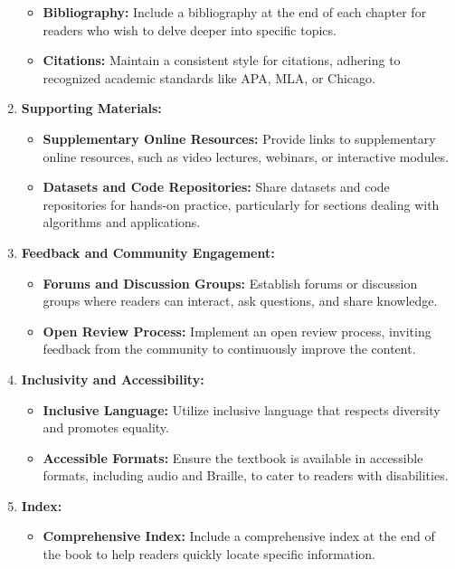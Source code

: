 \documentclass[
  11pt,
  letterpaper,
  abstract]{scrbook}
\providecommand{\tightlist}{%
  \setlength{\itemsep}{0pt}\setlength{\parskip}{0pt}}\usepackage{longtable,booktabs,array}
\begin{document}
\begin{enumerate}
  \begin{itemize}
  \tightlist
  \item
    \textbf{Bibliography:} Include a bibliography at the end of each
    chapter for readers who wish to delve deeper into specific topics.
  \item
    \textbf{Citations:} Maintain a consistent style for citations,
    adhering to recognized academic standards like APA, MLA, or Chicago.
  \end{itemize}
\item
  \textbf{Supporting Materials:}

  \begin{itemize}
  \tightlist
  \item
    \textbf{Supplementary Online Resources:} Provide links to
    supplementary online resources, such as video lectures, webinars, or
    interactive modules.
  \item
    \textbf{Datasets and Code Repositories:} Share datasets and code
    repositories for hands-on practice, particularly for sections
    dealing with algorithms and applications.
  \end{itemize}
\item
  \textbf{Feedback and Community Engagement:}

  \begin{itemize}
  \tightlist
  \item
    \textbf{Forums and Discussion Groups:} Establish forums or
    discussion groups where readers can interact, ask questions, and
    share knowledge.
  \item
    \textbf{Open Review Process:} Implement an open review process,
    inviting feedback from the community to continuously improve the
    content.
  \end{itemize}
\item
  \textbf{Inclusivity and Accessibility:}

  \begin{itemize}
  \tightlist
  \item
    \textbf{Inclusive Language:} Utilize inclusive language that
    respects diversity and promotes equality.
  \item
    \textbf{Accessible Formats:} Ensure the textbook is available in
    accessible formats, including audio and Braille, to cater to readers
    with disabilities.
  \end{itemize}
\item
  \textbf{Index:}

  \begin{itemize}
  \tightlist
  \item
    \textbf{Comprehensive Index:} Include a comprehensive index at the
    end of the book to help readers quickly locate specific information.
  \end{itemize}
\end{enumerate}
\end{document}

